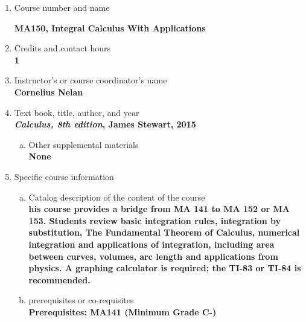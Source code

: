 \label{MA150}  %
\begin{enumerate}[1.]
\item Course number and name\\
  {\bfseries
    MA150, Integral Calculus With Applications

  }
  
\item Credits and contact hours\\
  {\bfseries
    1  %
  }

\item Instructor's or course coordinator's name\\
  {\bfseries
    Cornelius Nelan
  }

\item Text book, title, author, and year\\
  {\bfseries
    {\em Calculus, 8th edition}, James Stewart, 2015
  }
\begin{enumerate}[a.]
\item Other supplemental materials\\
  {\bfseries
    None    
  }
\end{enumerate}

\item Specific course information
\begin{enumerate}[a.]  
\item Catalog description of the content of the course\\
  {\bfseries
his course provides a bridge from MA 141 to MA 152 or MA 153. Students review basic integration rules, integration by substitution, The Fundamental Theorem of Calculus, numerical integration and applications of integration, including area between curves, volumes, arc length and applications from physics. A graphing calculator is required; the TI-83 or TI-84 is recommended.    
  }

\item prerequisites or co-requisites\\
  {\bfseries
    Prerequisites: MA141 (Minimum Grade C-) \\  %
  }


\end{enumerate}
\end{enumerate}
